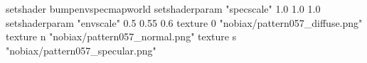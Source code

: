 setshader bumpenvspecmapworld
setshaderparam "specscale" 1.0 1.0 1.0
setshaderparam "envscale"  0.5 0.55 0.6
    texture 0 "nobiax/pattern057_diffuse.png"
    texture n "nobiax/pattern057_normal.png"
    texture s "nobiax/pattern057_specular.png"